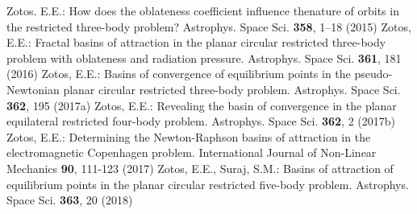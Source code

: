 \documentclass[preprint,fleqn,5p,numbers,sort&compress]{elsarticle}
\begin{document}
\begin{thebibliography}{}
  Zotos. E.E.: How does the oblateness coefficient influence thenature of orbits in the restricted three-body problem? Astrophys. Space Sci. \textbf{358}, 1--18 (2015)
 Zotos, E.E.: Fractal basins of attraction in the planar circular restricted three-body problem with oblateness and radiation pressure. Astrophys. Space Sci. \textbf{361}, 181 (2016)
 Zotos, E.E.: Basins of convergence of equilibrium points in the pseudo-Newtonian planar circular restricted three-body problem.  Astrophys. Space Sci. \textbf{362}, 195 (2017a)
 Zotos, E.E.: Revealing the basin of convergence in the planar equilateral restricted four-body problem. Astrophys. Space Sci. \textbf{362}, 2 (2017b)
 Zotos, E.E.: Determining the Newton-Raphson basins of attraction in the electromagnetic Copenhagen problem. International Journal of Non-Linear Mechanics \textbf{90}, 111-123 (2017)
 Zotos, E.E., Suraj, S.M.: Basins of attraction of equilibrium points in the planar circular restricted five-body problem. Astrophys. Space Sci. \textbf{363}, 20 (2018)
\end{thebibliography}
\end{document}
